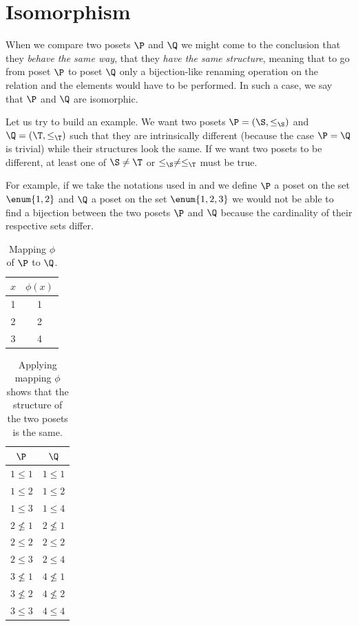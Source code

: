 \section{Isomorphism}

When we compare two posets $\P$ and $\Q$ we might come to the conclusion that
they \emph{behave the same way}, that they \emph{have the same structure},
meaning that to go from poset $\P$ to poset $\Q$ only a bijection-like renaming
operation on the relation and the elements would have to be performed. In such
a case, we say that $\P$ and $\Q$ are isomorphic.

Let us try to build an example. We want two posets $\P = (\S, \le_{\S})$ and $\Q =
(\T, \le_{\T})$ such that they are intrinsically different (because the case
$\P = \Q$ is trivial) while their structures look the same. If we want two posets
to be different, at least one of $\S \neq \T$ or $\le_{\S} \neq \le_{\T}$ must be true.

For example, if we take the notations used in  and we
define $\P$ a poset on the set $\enum{1, 2}$ and $\Q$ a poset on the set $\enum{1, 2, 3}$
we would not be able to find a bijection between the two posets $\P$ and $\Q$
because the cardinality of their respective sets differ.

\begin{table}
\centering
\caption{Mapping $\phi$ of $\P$ to $\Q$.}
\label{table:poset:iso:a}
\begin{tabular}{c|c}
	$x$ & $\phi(x)$ \\
	\hline
	1 & 1 \\
	2 & 2 \\
	3 & 4 \\
\end{tabular}
\end{table}

\begin{table}
\centering
\caption{Applying mapping $\phi$ shows that the structure of the two posets is
the same.}
\label{table:poset:iso:b}
\begin{tabular}{c|c}
	$\P$ & $\Q$\\
	\hline
	$1 \le 1$   & $1 \le 1$\\
	$1 \le 2$   & $1 \le 2$\\
	$1 \le 3$   & $1 \le 4$\\
	$2 \nleq 1$ & $2 \nleq 1$\\
	$2 \le 2$   & $2 \le 2$\\
	$2 \le 3$   & $2 \le 4$\\
	$3 \nleq 1$ & $4 \nleq 1$\\
	$3 \nleq 2$ & $4 \nleq 2$\\
	$3 \le 3$   & $4 \le 4$\\
\end{tabular}
\end{table}

